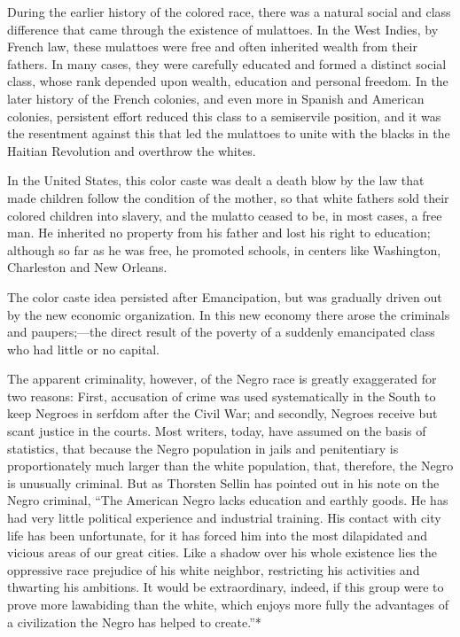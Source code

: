 \documentclass[letterpaper,10pt,english]{jupyterBook}
\begin{document}
\sphinxAtStartPar
During the earlier history of the colored race, there was a natural social and class difference that came through the existence of mulattoes. In the West Indies, by French law, these mulattoes were free and often inherited wealth from their fathers. In many cases, they were carefully educated and formed a distinct social class, whose rank depended upon wealth, education and personal freedom. In the later history of the French colonies, and even more in Spanish and American colonies, persistent effort reduced this class to a semi\sphinxhyphen{}servile position, and it was the resentment against this that led the mulattoes to unite with the blacks in the Haitian Revolution and overthrow the whites.

\sphinxAtStartPar
In the United States, this color caste was dealt a death blow by the law that made children follow the condition of the mother, so that white fathers sold their colored children into slavery, and the mulatto ceased to be, in most cases, a free man. He inherited no property from his father and lost his right to education; although so far as he was free, he promoted schools, in centers like Washington, Charleston and New Orleans.

\sphinxAtStartPar
The color caste idea persisted after Emancipation, but was gradually driven out by the new economic organization. In this new economy there arose the criminals and paupers;—the direct result of the poverty of a suddenly emancipated class who had little or no capital.

\sphinxAtStartPar
The apparent criminality, however, of the Negro race is greatly exaggerated for two reasons: First, accusation of crime was used systematically in the South to keep Negroes in serfdom after the Civil War; and secondly, Negroes receive but scant justice in the courts. Most writers, today, have assumed on the basis of statistics, that because the Negro population in jails and penitentiary is proportionately much larger than the white population, that, therefore, the Negro is unusually criminal. But as Thorsten Sellin has pointed out in his note on the Negro criminal, “The American Negro lacks education and earthly goods. He has had very little political experience and industrial training. His contact with city life has been unfortunate, for it has forced him into the most dilapidated and vicious areas of our great cities. Like a shadow over his whole existence lies the oppressive race prejudice of his white neighbor, restricting his activities and thwarting his ambitions. It would be extraordinary, indeed, if this group were to prove more law\sphinxhyphen{}abiding than the white, which enjoys more fully the advantages of a civilization the Negro has helped to create.”*
\end{document}
